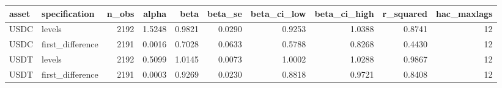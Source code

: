 \begin{tabular}{llrrrrrrrr}
\toprule
asset & specification & n_obs & alpha & beta & beta_se & beta_ci_low & beta_ci_high & r_squared & hac_maxlags \\
\midrule
USDC & levels & 2192 & 1.5248 & 0.9821 & 0.0290 & 0.9253 & 1.0388 & 0.8741 & 12 \\
USDC & first_difference & 2191 & 0.0016 & 0.7028 & 0.0633 & 0.5788 & 0.8268 & 0.4430 & 12 \\
USDT & levels & 2192 & 0.5099 & 1.0145 & 0.0073 & 1.0002 & 1.0288 & 0.9867 & 12 \\
USDT & first_difference & 2191 & 0.0003 & 0.9269 & 0.0230 & 0.8818 & 0.9721 & 0.8408 & 12 \\
\bottomrule
\end{tabular}
